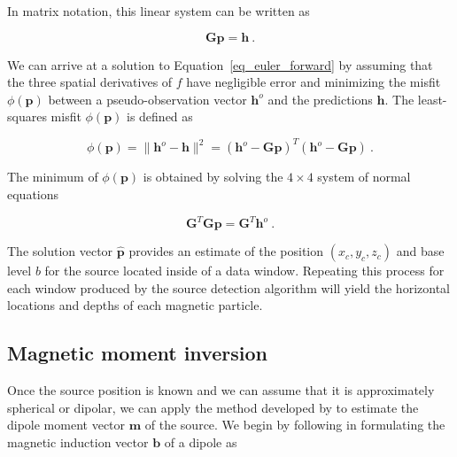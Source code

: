 In matrix notation, this linear system can be written as

\begin{equation}
\label{eq_euler_forward}
\mathbf{G} \mathbf{p} = \mathbf{h} \ .
\end{equation}

We can arrive at a solution to Equation~\ref{eq_euler_forward} by assuming that the three spatial derivatives of $f$ have negligible error and minimizing the misfit $\phi(\mathbf{p})$ between a pseudo-observation vector $\mathbf{h}^o$ and the predictions $\mathbf{h}$. The least-squares misfit $\phi(\mathbf{p})$ is defined as

\begin{equation}
\label{ZTSuSBbL16}
\phi(\mathbf{p}) = \|\mathbf{h}^o - \mathbf{h}\|^2 = (\mathbf{h}^o - \mathbf{G}\mathbf{p})^T (\mathbf{h}^o - \mathbf{G}\mathbf{p})\ .
\end{equation}

The minimum of $\phi(\mathbf{p})$ is obtained by solving the $4 \times 4$
system of normal equations

\begin{equation}
\mathbf{G}^T \mathbf{G} \mathbf{p} = \mathbf{G}^T \mathbf{h}^o\ .
\end{equation}

The solution vector $\hat{\mathbf{p}}$ provides an estimate of the position
$(x_c, y_c, z_c)$ and base level $b$ for the source located inside of a data
window. Repeating this process for each window produced by the source detection
algorithm will yield the horizontal locations and depths of each magnetic
particle.

\subsection{Magnetic moment inversion}

Once the source position is known and we can assume that it is approximately
spherical or dipolar, we can apply the method developed by
\citet{Oliveira2015Estimation} to estimate the dipole moment vector
$\mathbf{m}$ of the source. We begin by following
\citet{Oliveira2015Estimation} in formulating the magnetic induction vector
$\mathbf{b}$ of a dipole as

